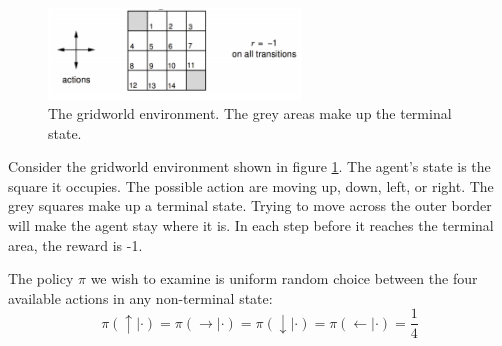 \documentclass[12pt, a4paper]{article}
\numberwithin{equation}{section}
\begin{document}
\begin{figure}
\centering
\includegraphics[width=0.6\textwidth]{gridworld}
\caption{The gridworld environment. The grey areas make up the terminal state.}
\label{fig:gridworld}
\end{figure}

Consider the gridworld environment shown in figure \ref{fig:gridworld}. The agent's state is the square it occupies. The possible action are moving up, down, left, or right. The grey squares make up a terminal state. Trying to move across the outer border will make the agent stay where it is. In each step before it reaches the terminal area, the reward is -1.

The policy $\pi$ we wish to examine is uniform random choice between the four available actions in any non-terminal state:
\begin{equation}
\pi(\uparrow|\cdot)=\pi(\rightarrow|\cdot)=\pi(\downarrow|\cdot)=\pi(\leftarrow|\cdot)=\frac{1}{4}
\end{equation}
\end{document}

